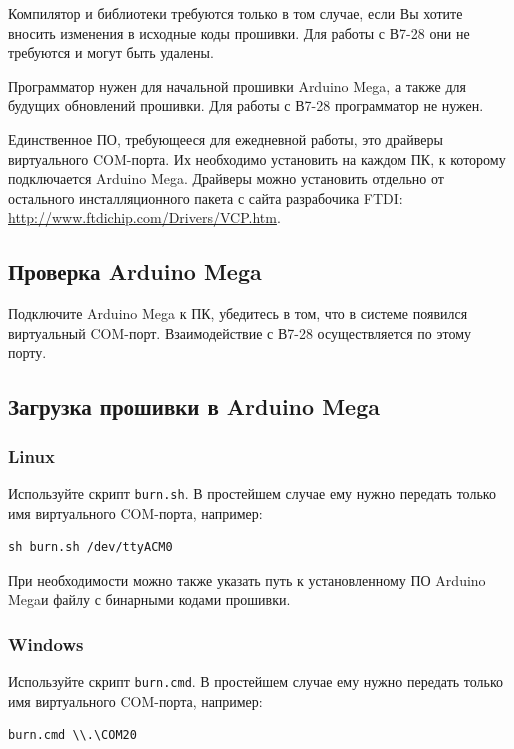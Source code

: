 \documentclass[12pt, a4paper]{article}
\newcommand{\V}{\mbox{В7-28}}
\newcommand{\Arduino}{Arduino Mega}
\begin{document}
Компилятор и библиотеки требуются только в том случае, если Вы хотите вносить изменения в исходные коды прошивки. Для работы с \V{} они не требуются и могут быть удалены.

Программатор нужен для начальной прошивки \Arduino, а также для будущих обновлений прошивки. Для работы с \V{} программатор не нужен.

Единственное ПО, требующееся для ежедневной работы, это драйверы виртуального COM-порта. Их необходимо установить на каждом ПК, к которому подключается \Arduino. Драйверы можно установить отдельно от остального инсталляционного пакета с сайта разрабочика FTDI: \url{http://www.ftdichip.com/Drivers/VCP.htm}.

\subsection{Проверка \Arduino}

Подключите \Arduino{} к ПК, убедитесь в том, что в системе появился виртуальный COM-порт. Взаимодействие с \V{} осуществляется по этому порту.

\subsection{Загрузка прошивки в \Arduino}

\subsubsection{Linux}

Используйте скрипт {\tt burn.sh}. В простейшем случае ему нужно передать только имя виртуального COM-порта, например:

\begin{verbatim}
sh burn.sh /dev/ttyACM0
\end{verbatim}

При необходимости можно также указать путь к установленному ПО \Arduino и файлу с бинарными кодами прошивки.

\subsubsection{Windows}

Используйте скрипт {\tt burn.cmd}. В простейшем случае ему нужно передать только имя виртуального COM-порта, например:

\begin{verbatim}
burn.cmd \\.\COM20
\end{verbatim}
\end{document}
